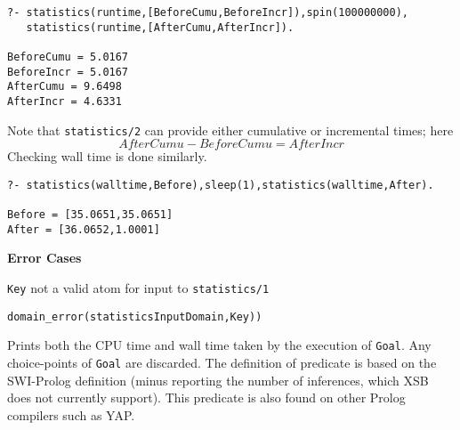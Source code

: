 \begin{description}
\begin{verbatim}
?- statistics(runtime,[BeforeCumu,BeforeIncr]),spin(100000000),
   statistics(runtime,[AfterCumu,AfterIncr]).

BeforeCumu = 5.0167
BeforeIncr = 5.0167
AfterCumu = 9.6498
AfterIncr = 4.6331
\end{verbatim}
Note that {\tt statistics/2} can provide either cumulative or
 incremental times; here
\[
 AfterCumu - BeforeCumu = AfterIncr
\]
Checking wall time is done similarly.
\begin{verbatim}
?- statistics(walltime,Before),sleep(1),statistics(walltime,After).

Before = [35.0651,35.0651]
After = [36.0652,1.0001]
\end{verbatim}

{\bf Error Cases}
\bi
\item {\tt Key} not a valid atom for input to {\tt statistics/1} 
\bi
\item 	{\tt domain\_error(statisticsInputDomain,Key))}
\ei
\ei
{}

%
Prints both the CPU time and wall time taken by the execution of \texttt{Goal}.
Any choice-points of \texttt{Goal} are discarded. The definition of predicate is based 
on the SWI-Prolog definition (minus reporting the number of inferences, which XSB does 
not currently support). This predicate is also found on other Prolog compilers such as YAP.

\end{description}





